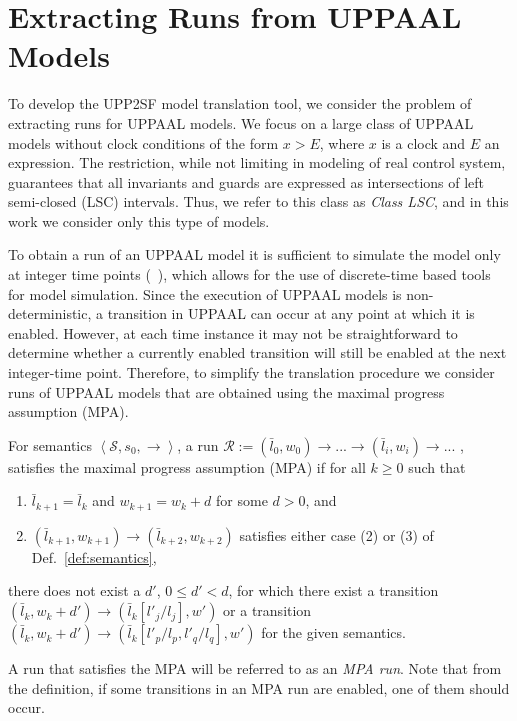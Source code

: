 \section{Extracting Runs from UPPAAL Models}
\label{sec:runs}


To develop the UPP2SF model translation tool, we consider the problem of extracting runs for UPPAAL models. We focus on a large class of UPPAAL models without clock conditions of the form $x>E$, where $x$ is a clock and $E$ an expression. The restriction, while not limiting in modeling of real control system, guarantees that all invariants and guards are expressed as intersections of left semi-closed (LSC) intervals. Thus, we refer to this class as \textit{Class LSC}, and in this work we consider only this type of models. 

To obtain a run of an UPPAAL model it is sufficient to simulate the model only at integer time points (~\cite{PMupp2sf_rtas12}), which allows for the use of discrete-time based tools for model simulation. Since the execution of UPPAAL models is non-deterministic, a transition in UPPAAL can occur at any point at which it is enabled. However, at each time instance it may not be straightforward to determine whether a currently enabled transition will still be enabled at the next integer-time point. 
Therefore, to simplify the translation procedure we consider runs of UPPAAL models that are obtained using the maximal progress assumption (MPA). 


\begin{definition}
For semantics $\left<\mathcal{S},s_0,\rightarrow\right>$, a run 
$\mathcal{R}:=(\bar{l}_0,w_0)\rightarrow...\rightarrow(\bar{l}_i,w_i)\rightarrow...$ , 
satisfies the maximal progress assumption (MPA) if for all $k\geq 0$ such that
\begin{enumerate}
\item $\bar{l}_{k+1}=\bar{l}_{k}$ and $w_{k+1}=w_k+d$ for some $d>0$, and
\item $(\bar{l}_{k+1},w_{k+1}) \rightarrow (\bar{l}_{k+2},w_{k+2})$ satisfies either case (2) or (3) of Def.~\ref{def:semantics},
\end{enumerate}
there does not exist a $d'$, $0\leq d'<d$, for which there exist a transition
$(\bar{l}_k,w_k+d') \rightarrow (\bar{l}_k[l'_j/l_j],w')$ or a transition $(\bar{l}_{k},w_{k}+d') \rightarrow (\bar{l}_k[l'_p/l_p,l'_q/l_q],w')$ for the given semantics.
\end{definition}

A run that satisfies the MPA will be referred to as an \textit{MPA run}. Note that from the definition, if some transitions in an MPA run are enabled, one of them should occur. 

